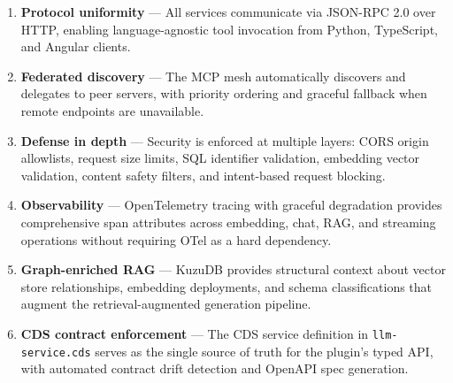 \documentclass[11pt]{article}
\newcommand{\code}[1]{\texttt{#1}}
\begin{document}
\begin{enumerate}
  \item \textbf{Protocol uniformity} --- All services communicate via
        JSON-RPC 2.0 over HTTP, enabling language-agnostic tool invocation
        from Python, TypeScript, and Angular clients.

  \item \textbf{Federated discovery} --- The MCP mesh automatically discovers
        and delegates to peer servers, with priority ordering and graceful
        fallback when remote endpoints are unavailable.

  \item \textbf{Defense in depth} --- Security is enforced at multiple layers:
        CORS origin allowlists, request size limits, SQL identifier validation,
        embedding vector validation, content safety filters, and intent-based
        request blocking.

  \item \textbf{Observability} --- OpenTelemetry tracing with graceful
        degradation provides comprehensive span attributes across embedding,
        chat, RAG, and streaming operations without requiring OTel as a
        hard dependency.

  \item \textbf{Graph-enriched RAG} --- KuzuDB provides structural context
        about vector store relationships, embedding deployments, and schema
        classifications that augment the retrieval-augmented generation
        pipeline.

  \item \textbf{CDS contract enforcement} --- The CDS service definition
        in \code{llm-service.cds} serves as the single source of truth for
        the plugin's typed API, with automated contract drift detection
        and OpenAPI spec generation.
\end{enumerate}
\end{document}
